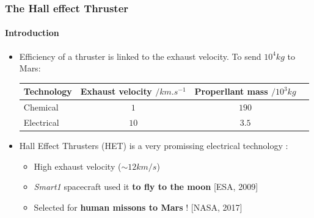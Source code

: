 \documentclass[sans, aspectratio=169]{beamer}
\begin{document}
\begin{frame} 
	\frametitle{The Hall effect Thruster} 
	\framesubtitle{Introduction} 
	\begin{itemize} 
		\item Efficiency of a thruster is linked to the exhaust velocity. To send $10^4 kg$ to Mars:
		
		\renewcommand{\arraystretch}{1.2}%
		\begin{center}
			\begin{tabular}{l|c|c|c}
				Technology & Exhaust velocity $/km.s^{-1}$ &Properllant mass $/10^3kg$\\ \hline 
				Chemical & $1 $ &     $190$   \\
				Electrical & $10$&   $3.5$ 
			\end{tabular}
		\end{center}
		\pause
		\vspace{0.2cm}
		\item Hall Effect Thrusters (HET) is a very promissing electrical technology :
		\begin{itemize} 
			\item High exhaust velocity ($\sim 12 km/s$)
			\item \textit{Smart1} spacecraft used it \textbf{to fly to the moon} [ESA, 2009]
			\item Selected for \textbf{human missons to Mars} ! [NASA, 2017]
		\end{itemize}
	\end{itemize}
		
\end{frame}
\end{document}
